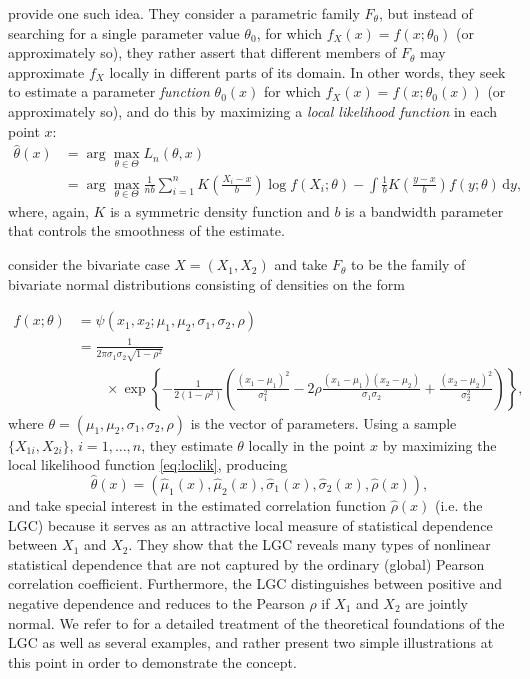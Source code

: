 \citet{hjor:jone:1996} provide one such idea. They consider a parametric family $F_{\theta}$, but instead of searching for a single parameter value $\theta_0$, for which $f_X(x) = f(x;\theta_0)$ (or approximately so), they rather assert that different members of $F_{\theta}$ may approximate $f_X$ locally in different parts of its domain. In other words, they seek to estimate a parameter \emph{function} $\theta_0(x)$ for which $f_X(x) = f(x;\theta_0(x))$ (or approximately so), and do this by maximizing a \emph{local likelihood function} in each point $x$:
\begin{align}
\widehat\theta(x) 
&= \arg\max_{\theta \in \Theta} L_n(\theta, x) \nonumber\\ 
&= \arg\max_{\theta \in \Theta} \frac{1}{nb}\sum_{i=1}^n K\left(\frac{X_i - x}{b}\right)\log f(X_i; \theta) - \int \frac{1}{b}K\left(\frac{y - x}{b}\right)f(y;\theta)\,\textrm{d}y,
\label{eq:loclik}
\end{align}
where, again, $K$ is a symmetric density function and $b$ is a bandwidth parameter that controls the smoothness of the estimate. 

\citet{tjos:huft:2013} consider the bivariate case $X = (X_1, X_2)$ and take $F_{\theta}$ to be the family of bivariate normal distributions consisting of densities on the form

\begin{align}
f(x;\theta) 
&= \psi(x_1, x_2;\mu_1, \mu_2, \sigma_1, \sigma_2, \rho)  \nonumber\\ 
&= \frac{1}{2\pi \sigma_1 \sigma_2\sqrt{1-\rho^2}} \nonumber \\
& \qquad \times\exp \left\{-\frac{1}{2(1-\rho^2)}\left(\frac{(x_1-\mu_1)^2}{\sigma_1^2}-2\rho\frac{(x_1-\mu_1)(x_2-\mu_2)}{\sigma_1 \sigma_2}+\frac{(x_2-\mu_2)^2}{\sigma_2^2}\right)\right\},
\label{eq:gaussian}
\end{align}
where $\theta = (\mu_1,\mu_2,\sigma_1,\sigma_2,\rho)$ is the vector of parameters. Using a sample $\{X_{1i}, X_{2i}\}$, $i = 1, \ldots, n$, they estimate $\theta$ locally in the point $x$ by maximizing the local likelihood function \eqref{eq:loclik}, producing
$$\widehat\theta(x) = (\widehat\mu_1(x), \widehat\mu_2(x), \widehat\sigma_1(x), \widehat\sigma_2(x), \widehat\rho(x)),$$
and take special interest in the estimated correlation function $\widehat\rho(x)$ (i.e. the LGC) because it serves as an attractive local measure of statistical dependence between $X_1$ and $X_2$. They show that the LGC reveals many types of nonlinear statistical dependence that are not captured by the ordinary (global) Pearson correlation coefficient. Furthermore, the LGC distinguishes between positive and negative dependence and reduces to the Pearson $\rho$ if $X_1$ and $X_2$ are jointly normal. We refer to \cite{tjos:huft:2013} for a detailed treatment of the theoretical foundations of the LGC as well as several examples, and rather present two simple illustrations at this point in order to demonstrate the concept. 

